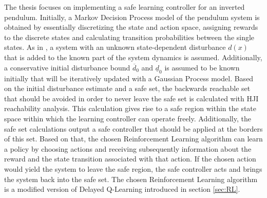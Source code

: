 \documentclass[../main.tex]{subfiles}
\begin{document}
The thesis focuses on implementing a safe learning controller for an inverted pendulum. Initially, a Markov Decision Process model of the pendulum system is obtained by essentially discretizing the state and action space, assigning rewards to the discrete states and calculating transition probabilities between the single states. As in \cite{akametalu2014reachability}, a system with an unknown state-dependent disturbance $d(x)$ that is added to the known part of the system dynamics is assumed. Additionally, a conservative initial disturbance bound $\overline{d}_0$ and $\underline{d}_0$ is assumed to be known initially that will be iteratively updated with a Gaussian Process model. Based on the initial disturbance estimate and a safe set, the backwards reachable set that should be avoided in order to never leave the safe set is calculated with HJI reachability analysis. This calculation gives rise to a safe region within the state space within which the learning controller can operate freely. Additionally, the safe set calculations output a safe controller that should be applied at the borders of this set. Based on that, the chosen Reinforcement Learning algorithm can learn a policy by choosing actions and receiving subsequently information about the reward and the state transition associated with that action. If the chosen action would yield the system to leave the safe region, the safe controller acts and brings the system back into the safe set. The chosen Reinforcement Learning algorithm is a modified version of Delayed Q-Learning introduced in section \ref{sec:RL}.
\end{document}
